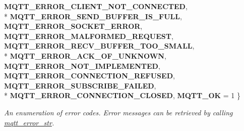 \begin{DoxyCompactItemize}
{\bfseries M\+Q\+T\+T\+\_\+\+E\+R\+R\+O\+R\+\_\+\+C\+L\+I\+E\+N\+T\+\_\+\+N\+O\+T\+\_\+\+C\+O\+N\+N\+E\+C\+T\+ED}, 
\\*
{\bfseries M\+Q\+T\+T\+\_\+\+E\+R\+R\+O\+R\+\_\+\+S\+E\+N\+D\+\_\+\+B\+U\+F\+F\+E\+R\+\_\+\+I\+S\+\_\+\+F\+U\+LL}, 
{\bfseries M\+Q\+T\+T\+\_\+\+E\+R\+R\+O\+R\+\_\+\+S\+O\+C\+K\+E\+T\+\_\+\+E\+R\+R\+OR}, 
{\bfseries M\+Q\+T\+T\+\_\+\+E\+R\+R\+O\+R\+\_\+\+M\+A\+L\+F\+O\+R\+M\+E\+D\+\_\+\+R\+E\+Q\+U\+E\+ST}, 
{\bfseries M\+Q\+T\+T\+\_\+\+E\+R\+R\+O\+R\+\_\+\+R\+E\+C\+V\+\_\+\+B\+U\+F\+F\+E\+R\+\_\+\+T\+O\+O\+\_\+\+S\+M\+A\+LL}, 
\\*
{\bfseries M\+Q\+T\+T\+\_\+\+E\+R\+R\+O\+R\+\_\+\+A\+C\+K\+\_\+\+O\+F\+\_\+\+U\+N\+K\+N\+O\+WN}, 
{\bfseries M\+Q\+T\+T\+\_\+\+E\+R\+R\+O\+R\+\_\+\+N\+O\+T\+\_\+\+I\+M\+P\+L\+E\+M\+E\+N\+T\+ED}, 
{\bfseries M\+Q\+T\+T\+\_\+\+E\+R\+R\+O\+R\+\_\+\+C\+O\+N\+N\+E\+C\+T\+I\+O\+N\+\_\+\+R\+E\+F\+U\+S\+ED}, 
{\bfseries M\+Q\+T\+T\+\_\+\+E\+R\+R\+O\+R\+\_\+\+S\+U\+B\+S\+C\+R\+I\+B\+E\+\_\+\+F\+A\+I\+L\+ED}, 
\\*
{\bfseries M\+Q\+T\+T\+\_\+\+E\+R\+R\+O\+R\+\_\+\+C\+O\+N\+N\+E\+C\+T\+I\+O\+N\+\_\+\+C\+L\+O\+S\+ED}, 
{\bfseries M\+Q\+T\+T\+\_\+\+OK} = 1
 \}\begin{DoxyCompactList}\small\item\em An enumeration of error codes. Error messages can be retrieved by calling \hyperlink{group__api_ga47b62bdd24e8b05957825d2419d7c848}{mqtt\+\_\+error\+\_\+str}. \end{DoxyCompactList}
\end{DoxyCompactItemize}
